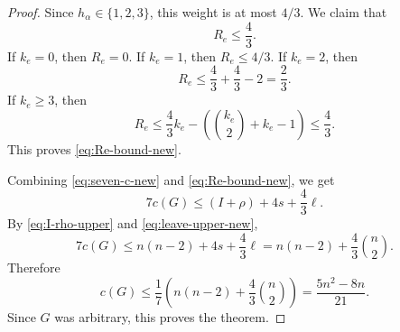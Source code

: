 \documentclass[10pt,a4paper]{amsart}
\begin{document}
\begin{proof}
    Since $h_\alpha\in\{1,2,3\}$, this weight is at most $4/3$.
    We claim that
    \begin{equation}\label{eq:Re-bound-new}
        R_e\le \frac{4}{3}.
    \end{equation}
    If $k_e=0$, then $R_e=0$.  If $k_e=1$, then $R_e\le4/3$.  If $k_e=2$,
    then
    \[
        R_e\le \frac{4}{3}+\frac{4}{3}-2=\frac23.
    \]
    If $k_e\ge3$, then
    \[
        R_e
        \le
        \frac{4}{3} k_e-\left(\binom{k_e}{2}+k_e-1\right)
        \le \frac{4}{3}.
    \]
    This proves \eqref{eq:Re-bound-new}.

    Combining \eqref{eq:seven-c-new} and \eqref{eq:Re-bound-new}, we get
    \[
        7c(G)\le (I+\rho)+4s+\frac{4}{3}\ell.
    \]
    By \eqref{eq:I-rho-upper} and \eqref{eq:leave-upper-new},
    \[
        7c(G)
        \le
        n(n-2)+4s+\frac{4}{3}\ell
        =
        n(n-2)+\frac{4}{3}\binom n2.
    \]
    Therefore
    \[
        c(G)
        \le
        \frac17\left(n(n-2)+\frac{4}{3}\binom n2\right)
        =
        \frac{5n^2-8n}{21}.
    \]
    Since $G$ was arbitrary, this proves the theorem.
\end{proof}
\end{document}
